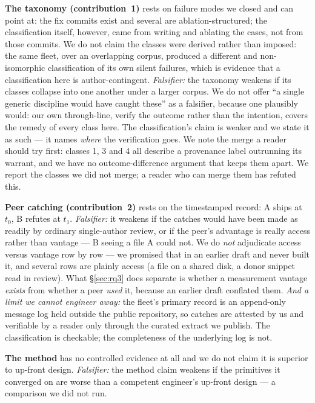 \documentclass[10pt,conference]{IEEEtran}   %
\begin{document}
\textbf{The taxonomy (contribution~1)} rests on failure modes we closed and can point at: the fix
commits exist and several are ablation-structured; the classification itself, however,
came from writing and ablating the cases, not from those commits. We do not claim the classes were
derived rather than imposed: the same fleet, over an overlapping corpus, produced a different and
non-isomorphic classification of its own silent failures, which is evidence that a classification
here is author-contingent. \emph{Falsifier:} the taxonomy weakens if its classes collapse into one another
under a larger corpus. We do not offer ``a single generic discipline would have caught
these'' as a falsifier, because one plausibly would: our own through-line, verify the outcome
rather than the intention, covers the remedy of every class here. The classification's claim is
weaker and we state it as such --- it names \emph{where} the verification goes. We note the merge a
reader should try first: classes 1, 3 and 4 all describe a provenance label outrunning its warrant,
and we have no outcome-difference argument that keeps them apart. We report the classes we did not
merge; a reader who can merge them has refuted this.

\textbf{Peer catching (contribution~2)} rests on the timestamped record: A ships at $t_0$, B refutes
at $t_1$. \emph{Falsifier:} it weakens if the catches would have been made as readily by ordinary
single-author review, or if the peer's advantage is really access rather than vantage --- B seeing a
file A could not. We do \emph{not} adjudicate access versus vantage row by row --- we
promised that in an earlier draft and never built it, and several rows are plainly access (a file on
a shared disk, a donor snippet read in review). What \S\ref{sec:rq3} does separate is whether a
measurement vantage \emph{exists} from whether a peer \emph{used} it, because an earlier draft
conflated them. \emph{And a limit we cannot engineer away:} the fleet's primary record is an
append-only message log held outside the public repository, so catches are attested by us and
verifiable by a reader only through the curated extract we publish. The classification is checkable;
the completeness of the underlying log is not.

\textbf{The method} has no controlled evidence at all and we do not claim it is superior to up-front
design. \emph{Falsifier:} the method claim weakens if the primitives it converged on are worse than a
competent engineer's up-front design --- a comparison we did not run.
\end{document}
